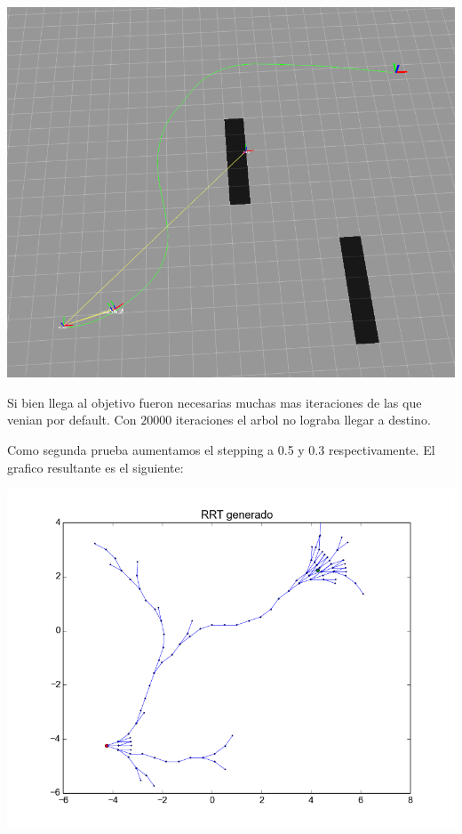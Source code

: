 \includegraphics[scale=0.3]{velocidad/stepping_Bajo_rviz1.png}

Si bien llega al objetivo fueron necesarias muchas mas iteraciones de las que venian por default. Con $20000$ iteraciones el arbol no lograba llegar a destino.

Como segunda prueba aumentamos el stepping a 0.5 y 0.3 respectivamente. El grafico resultante es el siguiente:

\includegraphics[scale=0.5]{velocidad/stepping_alto1.png}


